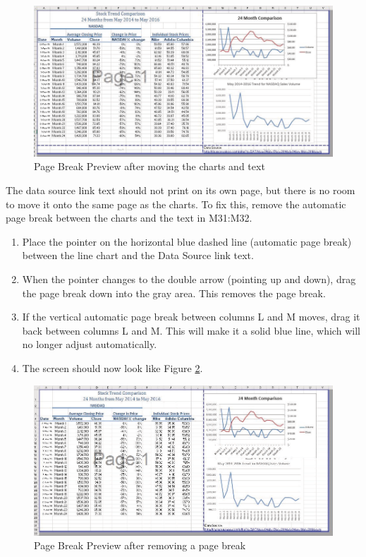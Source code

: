 \begin{figure}[H]
	\centering
	\includegraphics[width=\maxwidth{.95\linewidth}]{gfx/ch04_fig51}
	\caption{Page Break Preview after moving the charts and text}
	\label{04:fig51}
\end{figure}

The data source link text should not print on its own page, but there is no room to move it onto the same page as the charts. To fix this, remove the automatic page break between the charts and the text in \textsf{M31:M32}.

\begin{enumerate}
	\item Place the pointer on the horizontal blue dashed line (automatic page break) between the line chart and the Data Source link text.
	\item When the pointer changes to the double arrow (pointing up and down), drag the page break down into the gray area. This removes the page break.
	\item If the vertical automatic page break between columns L and M moves, drag it back between columns L and M. This will make it a solid blue line, which will no longer adjust automatically.
	\item The screen should now look like Figure \ref{04:fig52}.
\end{enumerate}

\begin{figure}[H]
	\centering
	\includegraphics[width=\maxwidth{.95\linewidth}]{gfx/ch04_fig52}
	\caption{Page Break Preview after removing a page break}
	\label{04:fig52}
\end{figure}

